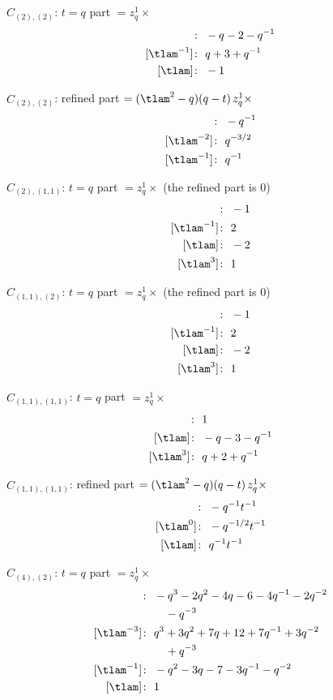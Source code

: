 $\hat C_{(2),(2)}$: $t = q$ part $= z_q^{1} \times$
\begin{align*}
[\tlam^{-3}]\colon\ & -q -2 -q^{-1} \\
[\tlam^{-1}]\colon\ & q +3 +q^{-1} \\
[\tlam]\colon\ & -1
\end{align*}

$\hat C_{(2),(2)}$: refined part $= (\tlam^2 - q)(q - t)\, z_q^{1} \times$
\begin{align*}
[\tlam^{-3}]\colon\ & -q^{-1} \\
[\tlam^{-2}]\colon\ & q^{-3/2} \\
[\tlam^{-1}]\colon\ & q^{-1}
\end{align*}

$\hat C_{(2),(1,1)}$: $t = q$ part $= z_q^{1} \times$ (the refined part is 0)
\begin{align*}
[\tlam^{-3}]\colon\ & -1 \\
[\tlam^{-1}]\colon\ & 2 \\
[\tlam]\colon\ & -2 \\
[\tlam^{3}]\colon\ & 1
\end{align*}

$\hat C_{(1,1),(2)}$: $t = q$ part $= z_q^{1} \times$ (the refined part is 0)
\begin{align*}
[\tlam^{-3}]\colon\ & -1 \\
[\tlam^{-1}]\colon\ & 2 \\
[\tlam]\colon\ & -2 \\
[\tlam^{3}]\colon\ & 1
\end{align*}

$\hat C_{(1,1),(1,1)}$: $t = q$ part $= z_q^{1} \times$
\begin{align*}
[\tlam^{-1}]\colon\ & 1 \\
[\tlam]\colon\ & -q -3 -q^{-1} \\
[\tlam^{3}]\colon\ & q +2 +q^{-1}
\end{align*}

$\hat C_{(1,1),(1,1)}$: refined part $= (\tlam^2 - q)(q - t)\, z_q^{1} \times$
\begin{align*}
[\tlam^{-1}]\colon\ & -q^{-1} t^{-1} \\
[\tlam^{0}]\colon\ & -q^{-1/2} t^{-1} \\
[\tlam]\colon\ & q^{-1} t^{-1}
\end{align*}

$\hat C_{(4),(2)}$: $t = q$ part $= z_q^{1} \times$
\begin{align*}
[\tlam^{-5}]\colon\ & -q^{3} -2 q^{2} -4 q -6 -4 q^{-1} -2 q^{-2} \\
& \quad -q^{-3} \\
[\tlam^{-3}]\colon\ & q^{3} +3 q^{2} +7 q +12 +7 q^{-1} +3 q^{-2} \\
& \quad +q^{-3} \\
[\tlam^{-1}]\colon\ & -q^{2} -3 q -7 -3 q^{-1} -q^{-2} \\
[\tlam]\colon\ & 1
\end{align*}

